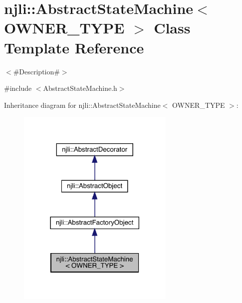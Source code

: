 \hypertarget{classnjli_1_1_abstract_state_machine}{}\section{njli\+:\+:Abstract\+State\+Machine$<$ O\+W\+N\+E\+R\+\_\+\+T\+Y\+PE $>$ Class Template Reference}
\label{classnjli_1_1_abstract_state_machine}


$<$\#\+Description\#$>$  




{\ttfamily \#include $<$Abstract\+State\+Machine.\+h$>$}



Inheritance diagram for njli\+:\+:Abstract\+State\+Machine$<$ O\+W\+N\+E\+R\+\_\+\+T\+Y\+PE $>$\+:\nopagebreak
\begin{figure}[H]
\begin{center}
\leavevmode
\includegraphics[width=213pt]{classnjli_1_1_abstract_state_machine__inherit__graph}
\end{center}
\end{figure}


